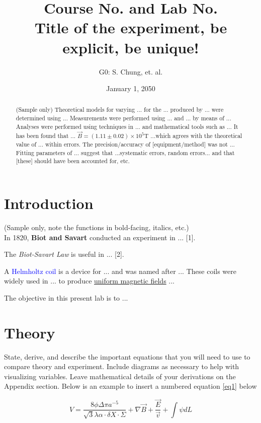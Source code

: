 \documentclass[letterpaper,11pt]{article}
\begin{document}
\title{Course No. and Lab No. \\\textbf{Title of the experiment, be explicit, be unique!}}
\author{G0: S. Chung, et. al.}
\date{January 1, 2050}
\maketitle

\begin{abstract}
(Sample only) Theoretical models for varying ... for the ... produced by ... were determined using ... Measurements were performed using ... and ... by means of ... Analyses were performed using techniques in ... and mathematical tools such as ... It has been found that ... $\vec{B}= (1.11 \pm 0.02)\times10^5\text{T}$ ...which agrees with the theoretical value of ... within errors. The precision/accuracy of [equipment/method] was not ... Fitting parameters of ... suggest that ...systematic errors, random errors... and that [these] should have been accounted for, etc. 
\end{abstract}

\section{Introduction}

(Sample only, note the functions in bold-facing, italics, etc.) \\In 1820, \textbf{Biot and Savart} conducted an experiment in ... [1]. 

The \textit{Biot-Savart Law} is useful in ... [2].

A \textcolor{blue}{Helmholtz coil} is a device for ... and was named after ... These coils were widely used in ... to produce \underline{uniform magnetic fields} ...

The objective in this present lab is to ...

\section{Theory}

State, derive, and describe the important equations that you will need to use to compare theory and experiment. Include diagrams as necessary to help with visualizing variables. Leave mathematical details of your derivations on the Appendix section. Below is an example to insert a numbered equation \ref{eq1} below

\begin{equation} \label{eq1} %
V=\frac{8\phi\Delta\pi a^{-5}}{\sqrt{3}\lambda\alpha\cdot\delta X \cdot\Sigma}+\nabla\vec{B}+\frac{\vec{E}}{\vec{v}}+\int \psi dL
\end{equation}
\end{document}

